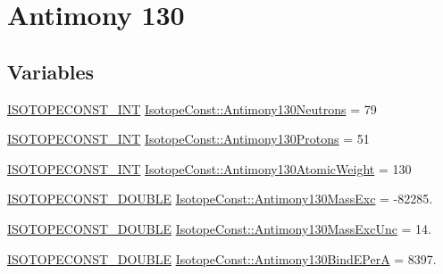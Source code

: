 \hypertarget{group___isotope_const-_antimony-_sb130}{}\section{Antimony 130}
\label{group___isotope_const-_antimony-_sb130}
\subsection*{Variables}
\begin{DoxyCompactItemize}
\item 
\mbox{\hyperlink{group___isotope_const-_macros_ga5f18360b3e99483a35c32d789e62621c}{I\+S\+O\+T\+O\+P\+E\+C\+O\+N\+S\+T\+\_\+\+I\+NT}} \mbox{\hyperlink{group___isotope_const-_antimony-_sb130_gad5567787445c3b5aaab33ed25569aeb3}{Isotope\+Const\+::\+Antimony130\+Neutrons}} = 79
\item 
\mbox{\hyperlink{group___isotope_const-_macros_ga5f18360b3e99483a35c32d789e62621c}{I\+S\+O\+T\+O\+P\+E\+C\+O\+N\+S\+T\+\_\+\+I\+NT}} \mbox{\hyperlink{group___isotope_const-_antimony-_sb130_gab5c5b26361a249d2a4e0352576d18516}{Isotope\+Const\+::\+Antimony130\+Protons}} = 51
\item 
\mbox{\hyperlink{group___isotope_const-_macros_ga5f18360b3e99483a35c32d789e62621c}{I\+S\+O\+T\+O\+P\+E\+C\+O\+N\+S\+T\+\_\+\+I\+NT}} \mbox{\hyperlink{group___isotope_const-_antimony-_sb130_ga963e60696d585f2319a56387db7dafdb}{Isotope\+Const\+::\+Antimony130\+Atomic\+Weight}} = 130
\item 
\mbox{\hyperlink{group___isotope_const-_macros_ga8f45a7272ce02c0b4c65c44636ed719a}{I\+S\+O\+T\+O\+P\+E\+C\+O\+N\+S\+T\+\_\+\+D\+O\+U\+B\+LE}} \mbox{\hyperlink{group___isotope_const-_antimony-_sb130_ga4a988d9bdce5561cc14f875bd72038d5}{Isotope\+Const\+::\+Antimony130\+Mass\+Exc}} = -\/82285.
\item 
\mbox{\hyperlink{group___isotope_const-_macros_ga8f45a7272ce02c0b4c65c44636ed719a}{I\+S\+O\+T\+O\+P\+E\+C\+O\+N\+S\+T\+\_\+\+D\+O\+U\+B\+LE}} \mbox{\hyperlink{group___isotope_const-_antimony-_sb130_ga71608db3ebc838d7836443599691b03f}{Isotope\+Const\+::\+Antimony130\+Mass\+Exc\+Unc}} = 14.
\item 
\mbox{\hyperlink{group___isotope_const-_macros_ga8f45a7272ce02c0b4c65c44636ed719a}{I\+S\+O\+T\+O\+P\+E\+C\+O\+N\+S\+T\+\_\+\+D\+O\+U\+B\+LE}} \mbox{\hyperlink{group___isotope_const-_antimony-_sb130_ga5d6e4af9f7e484bfb2cfc36ebd7665e9}{Isotope\+Const\+::\+Antimony130\+Bind\+E\+PerA}} = 8397.
\item 

\end{DoxyCompactItemize}
